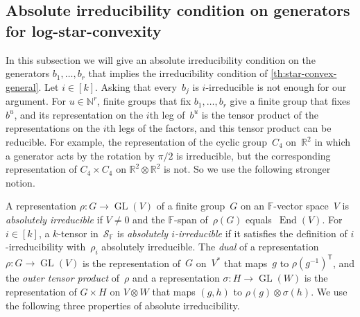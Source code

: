 \documentclass[11pt,letterpaper]{article}
\newcommand{\FF}{\mathbb{F}}
\newcommand{\RR}{\mathbb{R}}
\newcommand{\NN}{\mathbb{N}}
\DeclareMathOperator{\GL}{GL}
\DeclareMathOperator{\End}{End}
\begin{document}
\subsection{Absolute irreducibility condition on generators for log-star-convexity}\label{sec:absirred}

In this subsection we will give an absolute irreducibility condition on the generators $b_1, \ldots, b_r$ that implies the irreducibility condition of \cref{th:star-convex-general}. Let $i \in [k]$. Asking that every~$b_j$ is $i$-irreducible is not enough for our argument. For $u \in \NN^r$, finite groups that fix $b_1, \ldots, b_r$ give a finite group that fixes~$b^u$, and its representation on the $i$th leg of~$b^u$ is the tensor product of the representations on the $i$th legs of the factors, and this tensor product can be reducible. For example, the representation of the cyclic group~$C_4$ on~$\RR^2$ in which a generator acts by the rotation by $\pi/2$ is irreducible, but the corresponding representation of $C_4 \times C_4$ on $\RR^2 \otimes \RR^2$ is not. So we use the following stronger notion.

A representation $\rho : G \to \GL(V)$ of a finite group~$G$ on an $\FF$-vector space~$V$ is \emph{absolutely irreducible} if $V \neq 0$ and the $\FF$-span of~$\rho(G)$ equals~$\End(V)$. For $i \in [k]$, a $k$-tensor in~$\mathcal{S}_\FF$ is \emph{absolutely $i$-irreducible} if it satisfies the definition of $i$-irreducibility with~$\rho_i$ absolutely irreducible. The \emph{dual} of a representation $\rho : G \to \GL(V)$ is the representation of~$G$ on~$V^*$ that maps~$g$ to $\rho(g^{-1})^{\mathsf{T}}$, and the \emph{outer tensor product} of~$\rho$ and a representation $\sigma : H \to \GL(W)$ is the representation of $G \times H$ on $V \otimes W$ that maps $(g,h)$ to $\rho(g) \otimes \sigma(h)$. We use the following three properties of absolute irreducibility.
\end{document}
